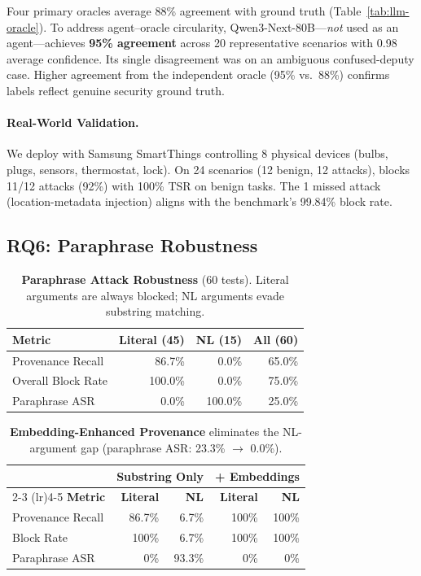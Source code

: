 Four primary oracles average 88\% agreement with ground truth (Table~\ref{tab:llm-oracle}). To address agent--oracle circularity, Qwen3-Next-80B---\emph{not} used as an agent---achieves \textbf{95\% agreement} across 20 representative scenarios with 0.98 average confidence. Its single disagreement was on an ambiguous confused-deputy case. Higher agreement from the independent oracle (95\% vs.\ 88\%) confirms labels reflect genuine security ground truth.

\paragraph{Real-World Validation.}
\label{subsec:real-world}
We deploy \sys{} with Samsung SmartThings controlling 8 physical devices (bulbs, plugs, sensors, thermostat, lock). On 24 scenarios (12 benign, 12 attacks), \sys{} blocks 11/12 attacks (92\%) with 100\% TSR on benign tasks. The 1 missed attack (location-metadata injection) aligns with the benchmark's 99.84\% block rate.

\subsection{RQ6: Paraphrase Robustness}
\label{subsec:paraphrase}

\begin{table}[t]
\centering
\caption{\textbf{Paraphrase Attack Robustness} (60 tests). Literal arguments are always blocked; NL arguments evade substring matching.}
\label{tab:paraphrase}
\small
\begin{tabular}{lrrr}
\toprule
\textbf{Metric} & \textbf{Literal (45)} & \textbf{NL (15)} & \textbf{All (60)} \\
\midrule
Provenance Recall     & 86.7\%  & 0.0\%   & 65.0\% \\
Overall Block Rate    & 100.0\% & 0.0\%   & 75.0\% \\
Paraphrase ASR        & 0.0\%   & 100.0\% & 25.0\% \\
\bottomrule
\end{tabular}
\end{table}

\begin{table}[t]
\centering
\caption{\textbf{Embedding-Enhanced Provenance} eliminates the NL-argument gap (paraphrase ASR: 23.3\% $\to$ 0.0\%).}
\label{tab:embedding-prov}
\small
\begin{tabular}{lrrrr}
\toprule
 & \multicolumn{2}{c}{\textbf{Substring Only}} & \multicolumn{2}{c}{\textbf{+ Embeddings}} \\
\cmidrule(lr){2-3} \cmidrule(lr){4-5}
\textbf{Metric} & \textbf{Literal} & \textbf{NL} & \textbf{Literal} & \textbf{NL} \\
\midrule
Provenance Recall  & 86.7\% & 6.7\%  & 100\% & 100\% \\
Block Rate         & 100\%  & 6.7\%  & 100\% & 100\% \\
Paraphrase ASR     & 0\%    & 93.3\% & 0\%   & 0\%   \\
\bottomrule
\end{tabular}
\end{table}


